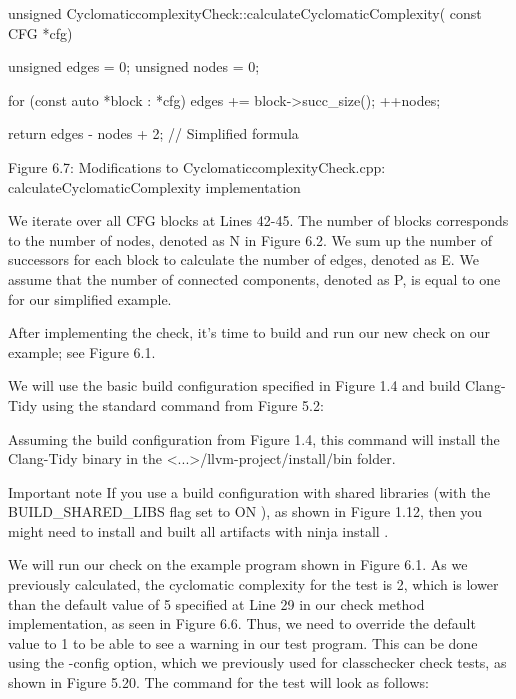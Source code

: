 \begin{cpp}
unsigned CyclomaticcomplexityCheck::calculateCyclomaticComplexity(
    const CFG *cfg) {
  unsigned edges = 0;
  unsigned nodes = 0;

  for (const auto *block : *cfg) {
    edges += block->succ_size();
    ++nodes;
  }

  return edges - nodes + 2;  // Simplified formula
}
\end{cpp}

\begin{center}
Figure 6.7: Modifications to CyclomaticcomplexityCheck.cpp: calculateCyclomaticComplexity implementation
\end{center}

We iterate over all CFG blocks at Lines 42-45. The number of blocks corresponds to the number of nodes, denoted as N in Figure 6.2. We sum up the number of successors for each block to calculate the number of edges, denoted as E. We assume that the number of connected components, denoted as P, is equal to one for our simplified example.

After implementing the check, it's time to build and run our new check on our example; see Figure 6.1.


We will use the basic build configuration specified in Figure 1.4 and build Clang-Tidy using the standard command from Figure 5.2:


Assuming the build configuration from Figure 1.4, this command will install the Clang-Tidy binary in the <...>/llvm-project/install/bin folder.

\begin{myNotic}{Important note}
If you use a build configuration with shared libraries (with the BUILD\_SHARED\_LIBS flag set to ON ), as shown in Figure 1.12, then you might need to install and built all artifacts with ninja install .
\end{myNotic}

We will run our check on the example program shown in Figure 6.1. As we previously calculated, the cyclomatic complexity for the test is 2, which is lower than the default value of 5 specified at Line 29 in our check method implementation, as seen in Figure 6.6. Thus, we need to override the default value to 1 to be able to see a warning in our test program. This can be done using the -config option, which we previously used for classchecker check tests, as shown in Figure 5.20. The command for the test will look as follows:

